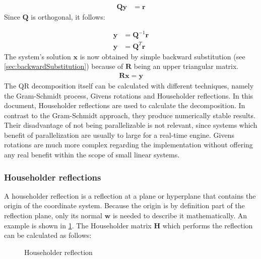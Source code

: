 \begin{align}
\mathbf{Qy} &= \mathbf{r}
\end{align}
%
Since $\mathbf{Q}$ is orthogonal, it follows:

\begin{align}
\mathbf{y} &= \mathbf{Q}^{-1}\mathbf{r}\\
\label{eq:qrSolveIntermediate}
\mathbf{y} &= \mathbf{Q}^T\mathbf{r}
\end{align}
%
The system's solution $\mathbf{x}$ is now obtained by simple backward substitution (see \cref{sec:backwardSubstitution}) because of $\mathbf{R}$ being an upper triangular matrix.
\begin{align}
\mathbf{R}\mathbf{x} = \mathbf{y}
\end{align}
%
The QR decomposition itself can be calculated with different techniques, namely the Gram-Schmidt process, Givens rotations and Householder reflections.
In this document, Householder reflections are used to calculate the decomposition.
In contrast to the Gram-Schmidt approach, they produce numerically stable results.
Their disadvantage of not being parallelizable is not relevant, since systems which benefit of parallelization are usually to large for a real-time engine.
Givens rotations are much more complex regarding the implementation without offering any real benefit within the scope of small linear systems. 
 



\subsubsection{Householder reflections}

A householder reflection is a reflection at a plane or hyperplane that contains the origin of the coordinate system.
Because the origin is by definition part of the reflection plane, only its normal $\mathbf{w}$ is needed to describe it mathematically.
An example is shown in \cref{fig:housholderReflection}.
The Householder matrix $\mathbf{H}$ which performs the reflection can be calculated as follows:


\begin{figure}
	\centering
	\caption{Householder reflection}
	\label{fig:housholderReflection}
\end{figure}


